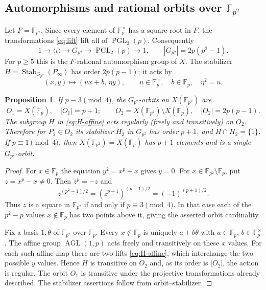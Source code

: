 \documentclass[12pt]{article}
\newtheorem{proposition}[theorem]{Proposition}
\numberwithin{equation}{section}
\newcommand{\F}{\mathbb{F}}
\newcommand{\Stab}{\operatorname{Stab}}
\newcommand{\AGL}{\operatorname{AGL}}
\newcommand{\PGL}{\operatorname{PGL}}
\begin{document}
\subsection{Automorphisms and rational orbits over $\F_{p^2}$}
\label{subsec:fp2}
Let $F=\F_{p^2}$.  Since every element of $\F_p^\times$
has a square root in $F$, the transformations
\eqref{eq:lift} lift all of $\PGL_2(p)$.  Consequently
\begin{equation}\label{eq:gq-order}
1\longrightarrow\langle\iota\rangle\longrightarrow
G_{p^2}\longrightarrow\PGL_2(p)\longrightarrow1,
\qquad |G_{p^2}|=2p(p^2-1).
\end{equation}
For $p\geq5$ this is the $F$-rational automorphism group
of $X$.  The stabilizer $H=\Stab_{G_{p^2}}(P_\infty)$
has order $2p(p-1)$; it acts by
\begin{equation}\label{eq:H-affine}
(x,y)\longmapsto (ux+b,\,\eta y),
\qquad u\in\F_p^\times,\quad b\in\F_p,\quad \eta^2=u.
\end{equation}

\begin{proposition}\label{prop:orbits}
If $p\equiv3\pmod4$, the $G_{p^2}$-orbits on $X(\F_{p^2})$ are
\[
O_1=X(\F_p),\quad |O_1|=p+1;
\qquad O_2=X(\F_{p^2})\setminus X(\F_p),
\quad |O_2|=2p(p-1).
\]
The subgroup $H$ in \eqref{eq:H-affine} acts regularly
(freely and transitively) on $O_2$.  Therefore for
$P_2\in O_2$ its stabilizer $H_2$ in $G_{p^2}$ has
order $p+1$, and $H\cap H_2=\{1\}$.
If $p\equiv1\pmod4$, then $X(\F_{p^2})=X(\F_p)$
has $p+1$ elements and is a single $G_{p^2}$-orbit.
\end{proposition}
\begin{proof}
For $x\in\F_p$ the equation $y^2=x^p-x$ gives $y=0$.
For $x\in\F_{p^2}\setminus\F_p$, put $z=x^p-x\ne0$.
Then $z^p=-z$ and
\[
z^{(p^2-1)/2}=(z^{p-1})^{(p+1)/2}
=(-1)^{(p+1)/2}.
\]
Thus $z$ is a square in $\F_{p^2}$ if and only if
$p\equiv3\pmod4$.  In that case each of the $p^2-p$
values $x\notin\F_p$ has two points above it, giving the
asserted orbit cardinality.

Fix a basis $1,\theta$ of $\F_{p^2}$ over $\F_p$.
Every $x\notin\F_p$ is uniquely $a+b\theta$ with
$a\in\F_p$, $b\in\F_p^\times$.  The affine group
$\AGL(1,p)$ acts freely and transitively on these $x$ values.
For each such affine map there are two lifts \eqref{eq:H-affine},
which interchange the two possible $y$ values.
Hence $H$ is transitive on $O_2$ and, as its order is
$|O_2|$, the action is regular.  The orbit $O_1$ is
transitive under the projective transformations already described.
The stabilizer assertions follow from orbit--stabilizer.
\end{proof}
\end{document}
